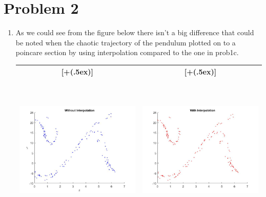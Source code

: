 \documentclass{article}
\newcommand*{\addheight}[2][.5ex]{%
  \raisebox{0pt}[\dimexpr\height+(#1)\relax]{#2}%
}
\begin{document}
\section*{Problem 2}
\begin{enumerate}[label=(\alph*)]

\item
As we could see from the figure below there isn't a big difference that could be noted when the chaotic trajectory of the pendulum plotted on to a poincare section by using interpolation compared to the one in prob1c.\par\medskip
\begin{minipage}{\linewidth}
{
\begin{table}[H]
\centering
\begin{tabular}{|c|c|}
	\hline
	\addheight{\includegraphics[height=75mm,width=75mm]{images/prob2a.jpg}} &
    \addheight{\includegraphics[height=75mm,width=75mm]{images/prob2b.jpg}} \\
    \hline
\end{tabular}
\end{table}
}
\end{minipage}

\end{enumerate}
\end{document}
